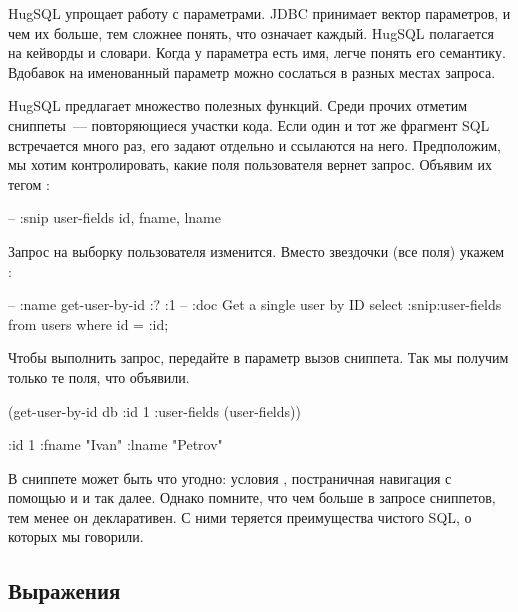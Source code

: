 HugSQL упрощает работу с параметрами. JDBC принимает вектор параметров, и чем их больше, тем сложнее понять, что означает каждый. HugSQL полагается на кейворды и словари. Когда у параметра есть имя, легче понять его семантику. Вдобавок на именованный параметр можно сослаться в разных местах запроса.


HugSQL предлагает множество полезных функций. Среди прочих отметим сниппеты~--- повторяющиеся участки кода. Если один и тот же фрагмент SQL встречается много раз, его задают отдельно и ссылаются на него. Предположим, мы хотим контролировать, какие поля пользователя вернет запрос. Объявим их тегом :

\begin{english}
  \begin{sql}
-- :snip user-fields
id, fname, lname
  \end{sql}
\end{english}

Запрос на выборку пользователя изменится. Вместо звездочки (все поля) укажем :

\begin{english}
  \begin{sql}
-- :name get-user-by-id :? :1
-- :doc Get a single user by ID
select :snip:user-fields from users
where id = :id;
  \end{sql}
\end{english}

Чтобы выполнить запрос, передайте в параметр  вызов сниппета. Так мы получим только те поля, что объявили.

\begin{english}
  \begin{clojure}
(get-user-by-id db
                {:id 1 :user-fields (user-fields)})

{:id 1
 :fname "Ivan"
 :lname "Petrov"}
  \end{clojure}
\end{english}

В сниппете может быть что угодно: условия , постраничная навигация с помощью  и  и так далее. Однако помните, что чем больше в запросе сниппетов, тем менее он декларативен. С ними теряется преимущества чистого SQL, о которых мы говорили.

\subsection{Выражения}

